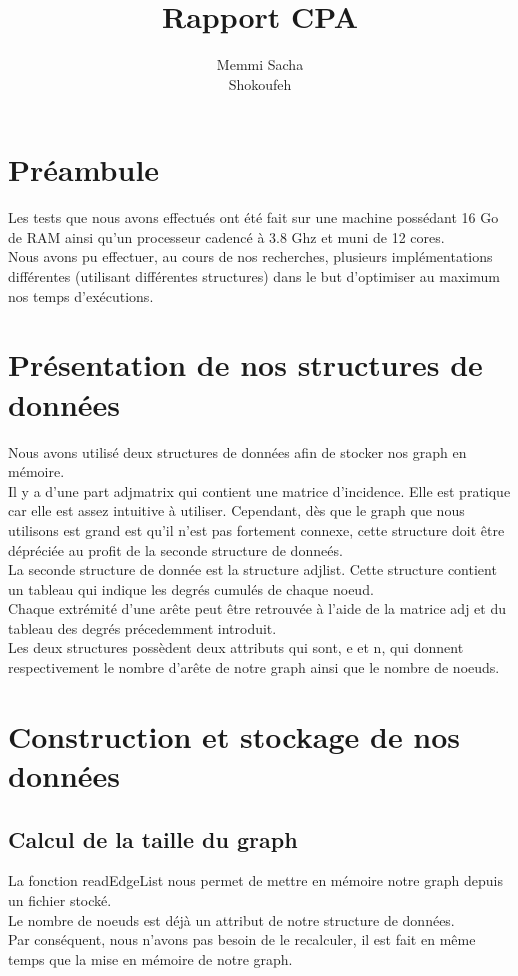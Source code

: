 \documentclass[a4paper,10pt]{report}
\title{Rapport CPA}
\author{Memmi Sacha \\ Shokoufeh}
\begin{document}
\maketitle

\clearpage
\chapter{Préambule}
Les tests que nous avons effectués ont été fait sur une machine possédant 16 Go de RAM ainsi qu'un processeur cadencé à 3.8 Ghz et muni de 12 cores.
\\
Nous avons pu effectuer, au cours de nos recherches, plusieurs implémentations différentes (utilisant différentes structures) dans le but d'optimiser au maximum nos temps d'exécutions. 
\newline 

\chapter{Présentation de nos structures de données}
Nous avons utilisé deux structures de données afin de stocker nos graph en mémoire.
\\
Il y a d'une part adjmatrix qui contient une matrice d'incidence. Elle est pratique car elle est assez intuitive à utiliser. Cependant, dès que le graph que nous utilisons est grand est qu'il n'est pas fortement connexe, cette structure doit être dépréciée au profit de la seconde structure de donneés.
\\
La seconde structure de donnée est la structure adjlist. Cette structure contient un tableau qui indique les degrés cumulés de chaque noeud. 
\\
Chaque extrémité d'une arête peut être retrouvée à l'aide de la matrice adj et du tableau des degrés précedemment introduit.
\\
Les deux structures possèdent deux attributs qui sont, e et n, qui donnent respectivement le nombre d'arête de notre graph ainsi que le nombre de noeuds.
\chapter{Construction et stockage de nos données}
\section{Calcul de la taille du graph}
La fonction readEdgeList nous permet de mettre en mémoire notre graph depuis un fichier stocké. 
\\
Le nombre de noeuds est déjà un attribut de notre structure de données. 
\\Par conséquent, nous n'avons pas besoin de le recalculer, il est fait en même temps que la mise en mémoire de notre graph.
\end{document}
